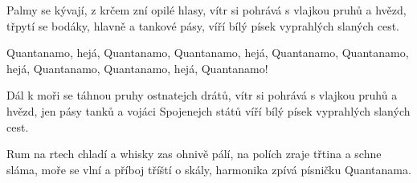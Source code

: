 
\beginverse{}
Palmy se kývají, z krčem zní opilé hlasy,
vítr si pohrává s vlajkou pruhů a hvězd,
třpytí se bodáky, hlavně a tankové pásy,
víří bílý písek vyprahlých slaných cest.
\endverse{}

\beginchorus{}
Quantanamo, hejá, Quantanamo,
Quantanamo, hejá, Quantanamo,
Quantanamo, hejá, Quantanamo,
Quantanamo, hejá, Quantanamo!
\endchorus{}

\beginverse{}
Dál k moři se táhnou pruhy ostnatejch drátů,
vítr si pohrává s vlajkou pruhů a hvězd,
jen pásy tanků a vojáci Spojenejch států
víří bílý písek vyprahlých slaných cest.
\endverse{}

\beginchorus{}

\endchorus{}

\beginverse{}
Rum na rtech chladí a whisky zas ohnivě pálí,
na polích zraje třtina a schne sláma,
moře se vlní a příboj tříští o skály,
harmonika zpívá písničku Quantanama.
\endverse{}

\beginchorus{}

\endchorus{}

\endsong{}
